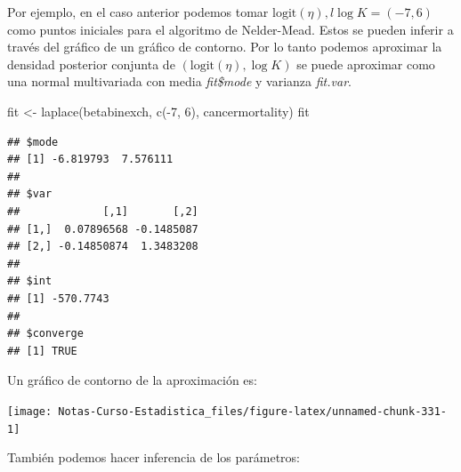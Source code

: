 \documentclass[
  12pt,
]{book}
\newenvironment{Shaded}{\begin{snugshade}}{\end{snugshade}}
\newcommand{\AttributeTok}[1]{\textcolor[rgb]{0.77,0.63,0.00}{#1}}
\newcommand{\DecValTok}[1]{\textcolor[rgb]{0.00,0.00,0.81}{#1}}
\newcommand{\FloatTok}[1]{\textcolor[rgb]{0.00,0.00,0.81}{#1}}
\newcommand{\FunctionTok}[1]{\textcolor[rgb]{0.00,0.00,0.00}{#1}}
\newcommand{\NormalTok}[1]{#1}
\newcommand{\OtherTok}[1]{\textcolor[rgb]{0.56,0.35,0.01}{#1}}
\newcommand{\SpecialCharTok}[1]{\textcolor[rgb]{0.00,0.00,0.00}{#1}}
\newcommand{\StringTok}[1]{\textcolor[rgb]{0.31,0.60,0.02}{#1}}
\theoremstyle{definition}
\theoremstyle{definition}
\theoremstyle{definition}
\theoremstyle{definition}
\theoremstyle{remark}
\begin{document}
Por ejemplo, en el caso anterior podemos tomar \(\mathrm{logit}(\eta),l\log K = (-7,6)\) como puntos iniciales para el algoritmo de Nelder-Mead. Estos se pueden inferir a través del gráfico de un gráfico de contorno. Por lo tanto podemos aproximar la densidad posterior conjunta de \((\text{logit}(\eta),\log K)\) se puede aproximar como una normal multivariada con media \emph{fit\$mode} y varianza \emph{fit.var}.

\begin{Shaded}
\begin{Highlighting}[]
\NormalTok{fit }\OtherTok{\textless{}{-}} \FunctionTok{laplace}\NormalTok{(betabinexch, }\FunctionTok{c}\NormalTok{(}\SpecialCharTok{{-}}\DecValTok{7}\NormalTok{, }\DecValTok{6}\NormalTok{), cancermortality)}
\NormalTok{fit}
\end{Highlighting}
\end{Shaded}

\begin{verbatim}
## $mode
## [1] -6.819793  7.576111
## 
## $var
##             [,1]       [,2]
## [1,]  0.07896568 -0.1485087
## [2,] -0.14850874  1.3483208
## 
## $int
## [1] -570.7743
## 
## $converge
## [1] TRUE
\end{verbatim}

Un gráfico de contorno de la aproximación es:

\begin{Shaded}
\end{Shaded}

\begin{center}\texttt{[image: Notas-Curso-Estadistica\_files/figure-latex/unnamed-chunk-331-1]} \end{center}

También podemos hacer inferencia de los parámetros:
\end{document}
